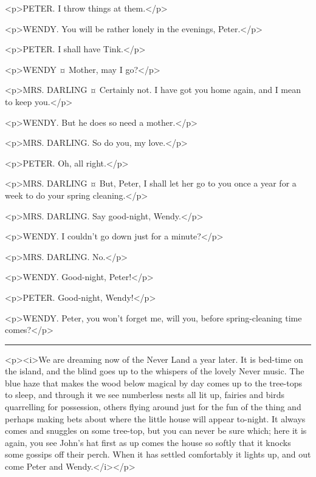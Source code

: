 \begin{drama}
<p>PETER. I throw things at them.</p>

<p>WENDY. You will be rather lonely in the evenings, Peter.</p>

<p>PETER. I shall have Tink.</p>

<p>WENDY ¤
Mother, may I go?</p>

<p>MRS. DARLING ¤
Certainly not. I have got you home again, and I mean to keep you.</p>

<p>WENDY. But he does so need a mother.</p>

<p>MRS. DARLING. So do you, my love.</p>

<p>PETER. Oh, all right.</p>

<p>MRS. DARLING ¤
But, Peter, I shall let her go to you once a year for a week to do your spring cleaning.</p>


<p>MRS. DARLING. Say good-night, Wendy.</p>

<p>WENDY. I couldn't go down just for a minute?</p>

<p>MRS. DARLING. No.</p>

<p>WENDY. Good-night, Peter!</p>

<p>PETER. Good-night, Wendy!</p>

<p>WENDY. Peter, you won't forget me, will you, before spring-cleaning time comes?</p>


\plainbreak{1}

<p><i>We are dreaming now of the Never Land a year later. It is bed-time on the island, and the blind goes up to the whispers of the lovely Never music. The blue haze that makes the wood below magical by day comes up to the tree-tops to sleep, and through it we see numberless nests all lit up, fairies and birds quarrelling for possession, others flying around just for the fun of the thing and perhaps making bets about where the little house will appear to-night. It always comes and snuggles on some tree-top, but you can never be sure which; here it is again, you see John's hat first as up comes the house so softly that it knocks some gossips off their perch. When it has settled comfortably it lights up, and out come Peter and Wendy.</i></p>


\end{drama}
